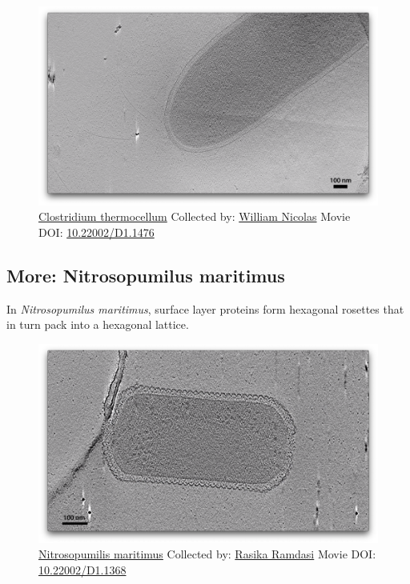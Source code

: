 \documentclass[]{tufte-book}
\begin{document}
\begin{figure}
\includegraphics{movie_stills/2_7b} \caption[\protect\hyperlink{tree}{Clostridium thermocellum} Collected
by: \protect\hyperlink{william_nicolas}{William Nicolas} Movie DOI:
\href{https://doi.org/10.22002/D1.1476}{10.22002/D1.1476}]{\protect\hyperlink{tree}{Clostridium thermocellum} Collected
by: \protect\hyperlink{william_nicolas}{William Nicolas} Movie DOI:
\href{https://doi.org/10.22002/D1.1476}{10.22002/D1.1476}}\label{fig:2-7b}
\end{figure}

\hypertarget{Nitrosopumilus_maritimus}{\subsection*{More: Nitrosopumilus
maritimus}\label{Nitrosopumilus_maritimus}}

In \emph{Nitrosopumilus maritimus}, surface layer proteins form
hexagonal rosettes that in turn pack into a hexagonal lattice.





\begin{figure}
\includegraphics{movie_stills/2_7c} \caption[\protect\hyperlink{tree}{Nitrosopumilis maritimus} Collected
by: \protect\hyperlink{rasika_ramdasi}{Rasika Ramdasi} Movie DOI:
\href{https://doi.org/10.22002/D1.1368}{10.22002/D1.1368}]{\protect\hyperlink{tree}{Nitrosopumilis maritimus} Collected
by: \protect\hyperlink{rasika_ramdasi}{Rasika Ramdasi} Movie DOI:
\href{https://doi.org/10.22002/D1.1368}{10.22002/D1.1368}}\label{fig:2-7c}
\end{figure}
\end{document}
